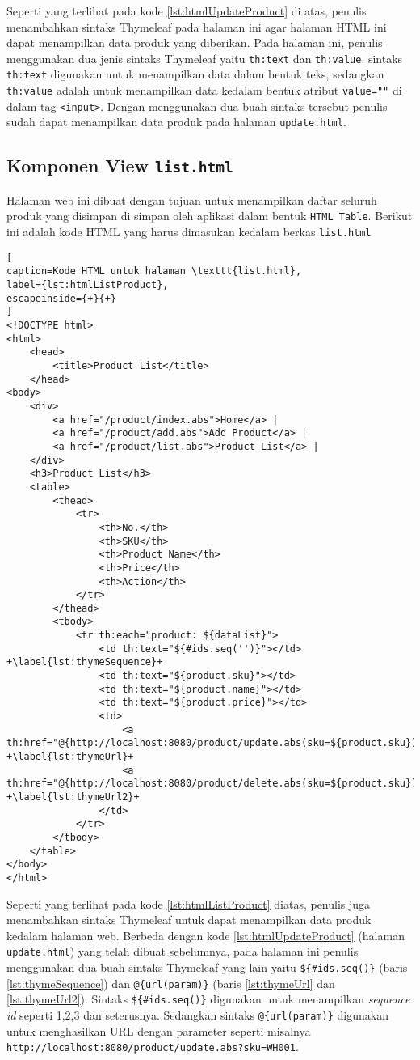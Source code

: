 Seperti yang terlihat pada kode \ref{lst:htmlUpdateProduct} di atas, penulis menambahkan sintaks Thymeleaf pada halaman ini agar halaman HTML ini dapat menampilkan data produk yang diberikan. Pada halaman ini, penulis menggunakan dua jenis sintaks Thymeleaf yaitu \texttt{th:text} dan \texttt{th:value}. sintaks \texttt{th:text} digunakan untuk menampilkan data dalam bentuk teks, sedangkan \texttt{th:value} adalah untuk menampilkan data kedalam bentuk atribut \texttt{value=""} di dalam tag \texttt{<input>}. Dengan menggunakan dua buah sintaks tersebut penulis sudah dapat menampilkan data produk pada halaman \texttt{update.html}.

\subsection{Komponen View \texttt{list.html}}

Halaman web ini dibuat dengan tujuan untuk menampilkan daftar seluruh produk yang disimpan di simpan oleh aplikasi dalam bentuk \texttt{HTML Table}. Berikut ini adalah kode HTML yang harus dimasukan kedalam berkas \texttt{list.html}

\begin{lstlisting}[
caption=Kode HTML untuk halaman \texttt{list.html},
label={lst:htmlListProduct},
escapeinside={+}{+}
]
<!DOCTYPE html>
<html>
	<head>
		<title>Product List</title>
	</head>
<body>
	<div>
		<a href="/product/index.abs">Home</a> |
		<a href="/product/add.abs">Add Product</a> |
		<a href="/product/list.abs">Product List</a> |
	</div>
	<h3>Product List</h3>
	<table>
		<thead>
			<tr>
				<th>No.</th>
				<th>SKU</th>
				<th>Product Name</th>
				<th>Price</th>
				<th>Action</th>
			</tr>
		</thead>
		<tbody>
			<tr th:each="product: ${dataList}">
				<td th:text="${#ids.seq('')}"></td> +\label{lst:thymeSequence}+
				<td th:text="${product.sku}"></td>
				<td th:text="${product.name}"></td>
				<td th:text="${product.price}"></td>
				<td>
					<a th:href="@{http://localhost:8080/product/update.abs(sku=${product.sku})}">update</a>&nbsp;&nbsp; +\label{lst:thymeUrl}+
					<a th:href="@{http://localhost:8080/product/delete.abs(sku=${product.sku})}">delete</a> +\label{lst:thymeUrl2}+
				</td>
			</tr>
		</tbody>
	</table>
</body>
</html>
\end{lstlisting}

Seperti yang terlihat pada kode \ref{lst:htmlListProduct} diatas, penulis juga menambahkan sintaks Thymeleaf untuk dapat menampilkan data produk kedalam halaman web. Berbeda dengan kode \ref{lst:htmlUpdateProduct} (halaman \texttt{update.html}) yang telah dibuat sebelumnya, pada halaman ini penulis menggunakan dua buah sintaks Thymeleaf yang lain yaitu \texttt{\$\{\#ids.seq()\}} (baris \ref{lst:thymeSequence}) dan \texttt{@\{url(param)\}} (baris \ref{lst:thymeUrl} dan \ref{lst:thymeUrl2}). Sintaks \texttt{\$\{\#ids.seq()\}} digunakan untuk menampilkan \textit{sequence id} seperti 1,2,3 dan seterusnya. Sedangkan sintaks \texttt{@\{url(param)\}} digunakan untuk menghasilkan URL dengan parameter seperti misalnya \texttt{http://localhost:8080/product/update.abs?sku=WH001}.

